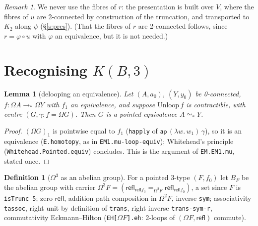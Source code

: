 \documentclass[11pt]{amsart}
\newtheorem{lemma}[theorem]{Lemma}
\theoremstyle{definition}
\newtheorem{definition}[theorem]{Definition}
\theoremstyle{remark}
\newtheorem{remark}[theorem]{Remark}
\newcommand{\Om}{\Omega}
\newcommand{\code}[1]{\texttt{#1}}
\newcommand{\refl}{\mathsf{refl}}
\newcommand{\ap}{\mathsf{ap}}
\begin{document}
\begin{remark}
We never use the fibres of $r$: the presentation is built over $V$, where
the fibres of $u$ are 2-connected by construction of the truncation, and
transported to $K_2$ along $\psi$ (\S\ref{s:pres}). (That the fibres of
$r$ are 2-connected follows, since $r=\varphi\circ u$ with $\varphi$ an
equivalence, but it is not needed.)
\end{remark}

\section{Recognising $K(B,3)$}

\begin{lemma}[delooping an equivalence]\label{l:deloop}
Let $(A,a_0)$, $(Y,y_0)$ be 0-connected, $f:\Om A\to_*\Om Y$ with $f_1$ an
equivalence, and suppose $\mathrm{Unloop}\,f$ is contractible, with centre
$(G,\gamma:f=\Om G)$. Then $G$ is a pointed equivalence $A\simeq_*Y$.
\end{lemma}
\begin{proof}
$(\Om G)_1$ is pointwise equal to $f_1$ (\code{happly} of
$\ap\,(\lambda w.\,w_1)\,\gamma$), so it is an equivalence (\code{E.homotopy}, as
in \code{EM1.mu-loop-equiv}); Whitehead's principle
(\code{Whitehead.Pointed.equiv}) concludes. This is the argument of
\code{EM.EM1.mu}, stated once.
\end{proof}

\begin{definition}[$\Om^3$ as an abelian group]\label{d:B}
For a pointed 3-type $(F,f_0)$ let $B_F$ be the abelian group with carrier
$\Om^3F=(\refl_{\refl f_0}=_{\Om^2F}\refl_{\refl f_0})$, a set since $F$ is
\code{isTrunc 5}; zero $\refl$, addition path composition in $\Om^2F$,
inverse \code{sym}; associativity \code{tassoc}, right unit by definition
of \code{trans}, right inverse \code{trans-sym-r}, commutativity
Eckmann--Hilton (\code{EH[$\Om F$].eh}: 2-loops of $(\Om F,\refl)$ commute).
\end{definition}
\end{document}
